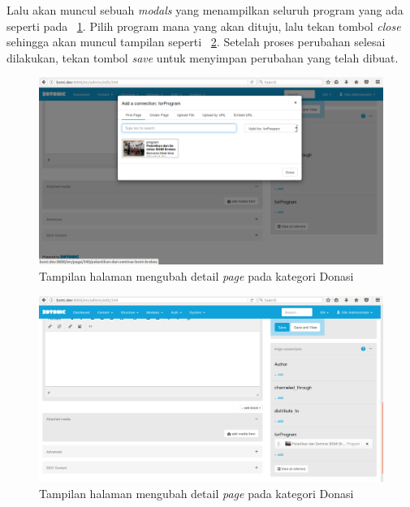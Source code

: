 Lalu akan muncul sebuah \textit{modals} yang menampilkan seluruh program yang ada seperti pada \pic~\ref{fig:edit2donation3}. Pilih program mana yang akan dituju, lalu tekan tombol \textit{close} sehingga akan muncul tampilan seperti \pic~\ref{fig:edit2donation4}. Setelah proses perubahan selesai dilakukan, tekan tombol \textit{save} untuk menyimpan perubahan yang telah dibuat.
\begin{figure}
	\centering
	\includegraphics[width=1\textwidth]
	{pics/16-edit2Donation3.png}
	\caption{Tampilan halaman mengubah detail \textit{page} pada kategori Donasi}
	\label{fig:edit2donation3}
\end{figure}
\vspace{-0.3cm}

\begin{figure}
	\centering
	\includegraphics[width=1\textwidth]
	{pics/17-edit2Donation4.png}
	\caption{Tampilan halaman mengubah detail \textit{page} pada kategori Donasi}
	\label{fig:edit2donation4}
\end{figure}
\vspace{-0.3cm}


